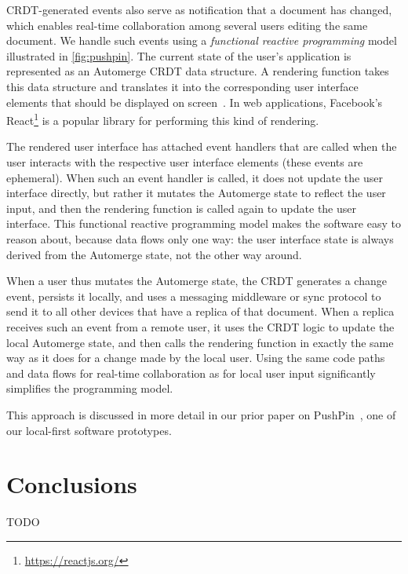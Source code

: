 \documentclass[sigconf,nonacm]{acmart}
\begin{document}
CRDT-generated events also serve as notification that a document has changed, which enables real-time collaboration among several users editing the same document.
We handle such events using a \emph{functional reactive programming} model illustrated in \autoref{fig:pushpin}.
The current state of the user's application is represented as an Automerge CRDT data structure.
A rendering function takes this data structure and translates it into the corresponding user interface elements that should be displayed on screen~\cite{vanHardenberg:2020}.
In web applications, Facebook's React\footnote{\url{https://reactjs.org/}} is a popular library for performing this kind of rendering.

The rendered user interface has attached event handlers that are called when the user interacts with the respective user interface elements (these events are ephemeral).
When such an event handler is called, it does not update the user interface directly, but rather it mutates the Automerge state to reflect the user input, and then the rendering function is called again to update the user interface.
This functional reactive programming model makes the software easy to reason about, because data flows only one way: the user interface state is always derived from the Automerge state, not the other way around.

When a user thus mutates the Automerge state, the CRDT generates a change event, persists it locally, and uses a messaging middleware or sync protocol to send it to all other devices that have a replica of that document.
When a replica receives such an event from a remote user, it uses the CRDT logic to update the local Automerge state, and then calls the rendering function in exactly the same way as it does for a change made by the local user.
Using the same code paths and data flows for real-time collaboration as for local user input significantly simplifies the programming model.

This approach is discussed in more detail in our prior paper on PushPin~\cite{vanHardenberg:2020}, one of our local-first software prototypes.

\section{Conclusions}

TODO


{}
\end{document}

